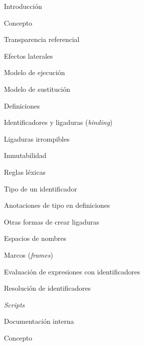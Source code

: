 \begin{longenum}
    \begin{longenum}
        \item Introducción
        \begin{longenum}
            \item Concepto
            \item Transparencia referencial
            \begin{longenum}
                \item Efectos laterales
            \end{longenum}
            \item Modelo de ejecución
            \begin{longenum}
                \item Modelo de sustitución
            \end{longenum}
        \end{longenum}
        \item Definiciones
        \begin{longenum}
            \item Identificadores y ligaduras (\textit{binding})
            \begin{longenum}
                \item Ligaduras irrompibles
                \item Inmutabilidad
                \item Reglas léxicas
                \item Tipo de un identificador
                \item Anotaciones de tipo en definiciones
                \item Otras formas de crear ligaduras
            \end{longenum}
            \item Espacios de nombres
            \item Marcos (\textit{frames})
            \item Evaluación de expresiones con identificadores
            \begin{longenum}
                \item Resolución de identificadores
            \end{longenum}
        \end{longenum}
        \item \textit{Scripts}
        \item Documentación interna
        \begin{longenum}
            \item Concepto

\end{longenum}
\end{longenum}
\end{longenum}
